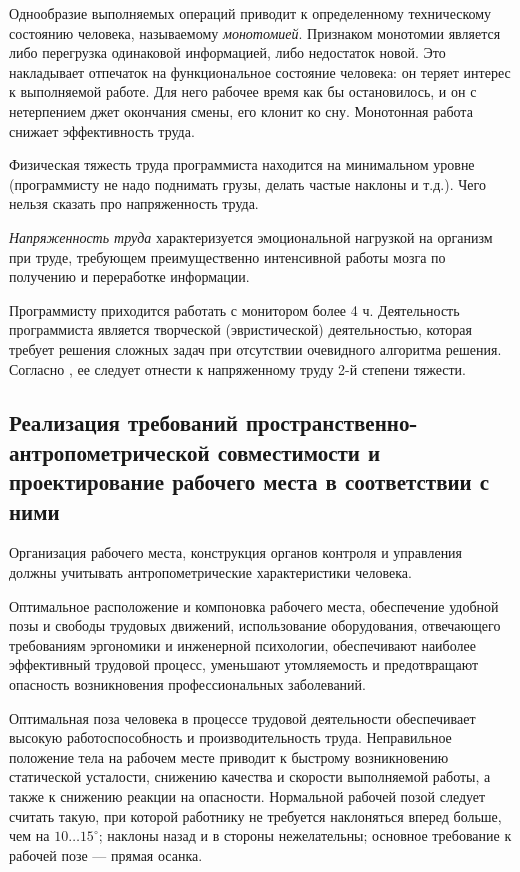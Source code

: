 Однообразие выполняемых операций приводит к определенному техническому состоянию человека, называемому \emph{монотомией}. Признаком монотомии является либо перегрузка одинаковой информацией, либо недостаток новой. Это накладывает отпечаток на функциональное состояние человека: он теряет интерес к выполняемой работе. Для него рабочее время как бы остановилось, и он с нетерпением джет окончания смены, его клонит ко сну. Монотонная работа снижает эффективность труда.\cite{belov09}

Физическая тяжесть труда программиста находится на минимальном уровне (программисту не надо поднимать грузы, делать частые наклоны и т.д.).
Чего нельзя сказать про напряженность труда.\cite{belov09}

\emph{Напряженность труда} характеризуется эмоциональной нагрузкой на организм при труде, требующем преимущественно интенсивной работы мозга по получению и переработке информации.\cite{belov09}

Программисту приходится работать с монитором более 4 ч. Деятельность программиста является творческой (эвристической) деятельностью, которая требует решения сложных задач при отсутствии очевидного алгоритма решения. Согласно \cite{belov09}, ее следует отнести к напряженному труду 2-й степени тяжести.

\subsection{Реализация требований пространственно-антропометрической совместимости и проектирование рабочего места в соответствии с ними}
Организация рабочего места, конструкция органов контроля и управления должны учитывать антропометрические характеристики человека.\cite{devisilov09}

Оптимальное расположение и компоновка рабочего места, обеспечение удобной позы и свободы трудовых движений, использование оборудования, отвечающего требованиям эргономики и инженерной психологии, обеспечивают наиболее эффективный трудовой процесс, уменьшают утомляемость и предотвращают опасность возникновения профессиональных заболеваний.

Оптимальная поза человека в процессе трудовой деятельности обеспечивает высокую работоспособность и производительность труда. Неправильное положение тела на рабочем месте приводит к быстрому возникновению статической усталости, снижению качества и скорости выполняемой работы, а также к снижению реакции на опасности. Нормальной рабочей позой следует считать такую, при которой работнику не требуется наклоняться вперед больше, чем на \(10\dots15^{\circ}\); наклоны назад и в стороны нежелательны; основное требование к рабочей позе --- прямая осанка.

